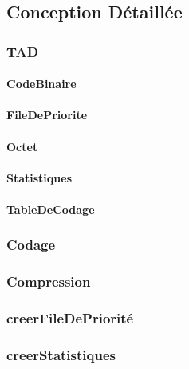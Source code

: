  \subsection{Conception Détaillée}

 \subsubsection{TAD}
 \paragraph{CodeBinaire}
 
 \paragraph{FileDePriorite}
 
 \paragraph{Octet}
 
 \paragraph{Statistiques}
 
 \paragraph{TableDeCodage} 
 

 \subsubsection{Codage}
 

 \subsubsection{Compression}
 

 \subsubsection{creerFileDePriorité}
 

 \subsubsection{creerStatistiques}
 

